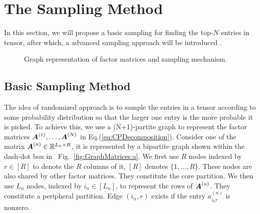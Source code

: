 \documentclass[10pt,journal,compsoc]{IEEEtran}
\newcommand{\Sca}[3]{{#1}^{(#2)}_{i_#2#3}}%
\newcommand{\anr}[2]{\Sca{a}{#1}{#2}}
\newcommand{\M}[1]{{\boldsymbol{{\MakeUppercase{#1}}}}}
\newcommand{\FacMat}[2]{\M{#1}^{(#2)}}
\newcommand{\Eqn}[1]{Eq.(\ref{eq:#1})}
\newcommand{\Fig}[1]{Fig.~\ref{fig:#1}}
\begin{document}




\section{The Sampling Method}
In this section, we will propose a basic sampling for finding the top-$N$ entries in tensor, after which, a advanced sampling approach will be introduced .

\begin{figure*}[!ht]
	\centering
	\qquad
	\caption{Graph representation of factor matrices and sampling mechanism.}
	\label{fig:GraphMatrices}
\end{figure*}


\subsection{Basic Sampling Method}

The idea of randomized approach is to sample the entries in a tensor according to some probability distribution so that the larger one entry is the more probable it is picked. To achieve this, we use a (N+1)-partite graph to represent the factor matrices $\FacMat{A}{1},\ldots,\FacMat{A}{N}$ in \Eqn{CPDecomposition}. Consider one of the matrix $\FacMat{A}{n}\in \mathbb{R}^{L_n \times R}$, it is represented by a bipartite graph shown within the dash-dot box in ~\Fig{GraphMatrices:a}.
We first use $R$ nodes indexed by $r\in[R]$ to denote the $R$ columns of it, $[R]$ denotes $\{1,\ldots,R\}$. These nodes are also shared by other factor matrices. They constitute the core partition. We then use $L_n$ nodes, indexed by $i_n\in [L_n]$, to represent the rows of $\FacMat{A}{n}$. They constitute a peripheral partition. Edge $(i_n,r)$ exists if the entry $\anr{n}{r}$ is nonzero.
\end{document}
